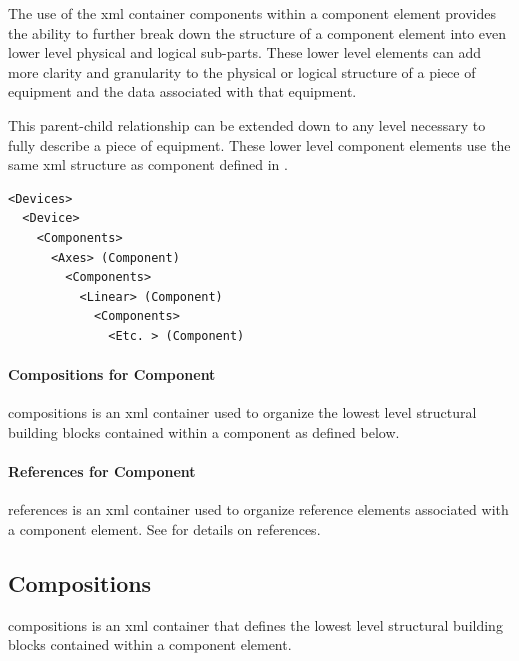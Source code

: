 The use of the \gls{xml} container \gls{components} within a \gls{component} element provides the ability to further break down the structure of a \gls{component} element into even \gls{lower level} physical and logical sub-parts.  These \gls{lower level} elements can add more clarity and granularity to the physical or logical structure of a piece of equipment and the data associated with that equipment.

This parent-child relationship can be extended down to any level necessary to fully describe a piece of equipment. These \gls{lower level} \gls{component} elements use the same \gls{xml} structure as \gls{component} defined in .

\begin{lstlisting}[firstnumber=1,escapechar=|,%
    caption={Example of parent Component and Child Elements },label={lst:example-of-parent-component-and-child-elements}]
<Devices>
  <Device>
    <Components>
      <Axes> (Component)
        <Components>
          <Linear> (Component)
            <Components>
              <Etc. > (Component)
\end{lstlisting}

\paragraph{Compositions for Component}\mbox{}

\gls{compositions} is an \gls{xml} container used to organize the lowest level structural building blocks contained within a \gls{component} as defined below.

\paragraph{References for Component}\mbox{}

\gls{references} is an \gls{xml} container used to organize \gls{reference} elements associated with a \gls{component} element.  See  for details on \gls{references}.

\subsection{Compositions}
\label{sec:Compositions}

\gls{compositions} is an \gls{xml} container that defines the lowest level structural building blocks contained within a \gls{component} element.   

